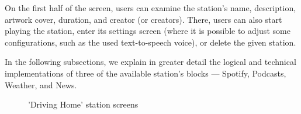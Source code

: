 On the first half of the screen, users can examine the station's name, description, artwork cover, duration, and creator (or creators). There, users can also start playing the station, enter its settings screen (where it is possible to adjust some configurations, such as the used text-to-speech voice), or delete the given station.

In the following subsections, we explain in greater detail the logical and technical implementations of three of the available station's blocks — Spotify, Podcasts, Weather, and News. 

\begin{figure}[htbp]
	\centering
	 \qquad
	 \qquad
	\caption{'Driving Home' station screens}
	\label{fig:mfp1}
\end{figure}




